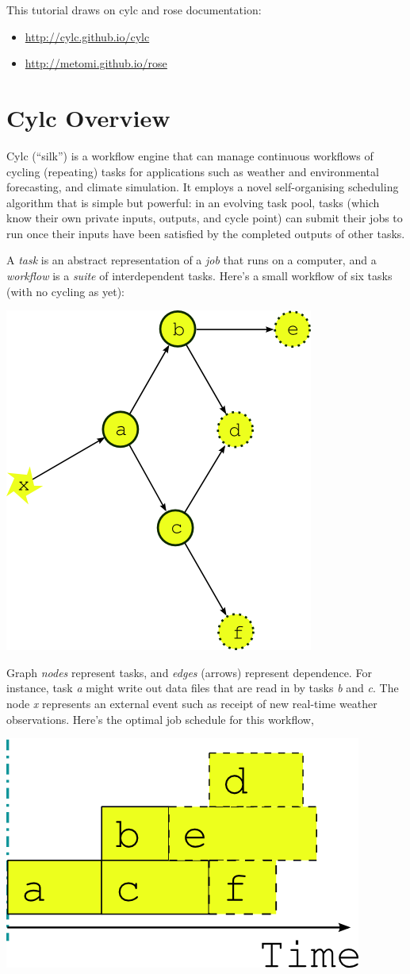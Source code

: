 This tutorial draws on cylc and rose documentation:

\begin{itemize}
    \item \url{http://cylc.github.io/cylc}
    \item \url{http://metomi.github.io/rose}
\end{itemize}


\section{Cylc Overview}

Cylc (``silk'') is a workflow engine that can manage continuous workflows of
cycling (repeating) tasks for applications such as weather and environmental
forecasting, and climate simulation.  It employs a novel self-organising
scheduling algorithm that is simple but powerful: in an evolving task pool,
tasks (which know their own private inputs, outputs, and cycle point) can
submit their jobs to run once their inputs have been satisfied by the
completed outputs of other tasks.

A {\em task} is an abstract representation of a {\em job} that runs on a
computer, and a {\em workflow} is a {\em suite} of interdependent tasks.
Here's a small workflow of six tasks (with no cycling as yet):

\begin{center}
    \includegraphics[width=0.25\columnwidth]{resources/tex/dep-one-cycle}
\end{center}

Graph {\em nodes} represent tasks, and {\em edges} (arrows) represent
dependence.  For instance, task {\em a} might write out data files that are
read in by tasks {\em b} and {\em c}.  The node {\em x} represents an external
event such as receipt of new real-time weather observations.  Here's the
optimal job schedule for this workflow,

\begin{center}
    \includegraphics[width=0.2\columnwidth]{resources/tex/timeline-zero.png}
\end{center}

